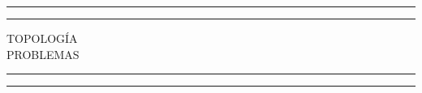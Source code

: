 \newcommand{\plogo}{\fbox{$\mathcal{PL}$}} %

\begin{titlepage} %

    \centering %

    \scshape %

    \vspace*{5\baselineskip} %


    \rule{\textwidth}{1.6pt}\vspace*{-\baselineskip}\vspace*{2pt} %
    \rule{\textwidth}{0.4pt} %

    \vspace{0.75\baselineskip} %

    {\LARGE TOPOLOGÍA \\} %
    PROBLEMAS

    \vspace{0.75\baselineskip} %

    \rule{\textwidth}{0.4pt}\vspace*{-\baselineskip}\vspace{3.2pt} %
    \rule{\textwidth}{1.6pt} %

    \vspace{1.5\baselineskip} %



    \vspace*{1\baselineskip} %




    \vspace{1\baselineskip} %


\end{titlepage}
